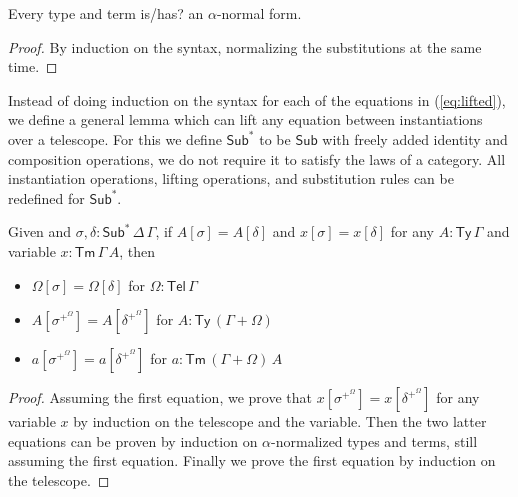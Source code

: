 \documentclass[sigplan,10pt,anonymous,review]{acmart}\settopmatter{printfolios=true,printccs=false,printacmref=false}
\newcommand{\Ty}{\mathsf{Ty}}
\newcommand{\Tm}{\mathsf{Tm}}
\newcommand{\Sub}{\mathsf{Sub}}
\newcommand{\Tel}{\mathsf{Tel}}
\begin{document}
\begin{lemma}
  \label{thm:alpha}
  Every type and term is/has? an $\alpha$-normal form.
\end{lemma}
\begin{proof}
  By induction on the syntax, normalizing the substitutions at the same time.
\end{proof}

Instead of doing induction on the syntax for each of the equations in
(\ref{eq:lifted}), we define a general lemma which can lift any equation between
instantiations over a telescope. For this we define $\Sub^*$ to be $\Sub$ with
freely added identity and composition operations, we do not require it to
satisfy the laws of a category. All instantiation operations, lifting
operations, and substitution rules can be redefined for $\Sub^*$.
\begin{lemma}
  \label{thm:lifting}
  Given and $\sigma, \delta : \Sub^*\,\Delta\,\Gamma$, if $A[\sigma] =
  A[\delta]$ and $x[\sigma] = x[\delta]$ for any $A:\Ty\,\Gamma$ and variable
  $x:\Tm\,\Gamma\,A$, then
  \begin{itemize}
    \item $\Omega[\sigma] = \Omega[\delta]$ for $\Omega:\Tel\,\Gamma$
    \item $A[\sigma^{+^\Omega}] = A[\delta^{+^\Omega}]$ for $A:\Ty\,(\Gamma+\Omega)$
    \item $a[\sigma^{+^\Omega}] = a[\delta^{+^\Omega}]$ for $a:\Tm\,(\Gamma+\Omega)\,A$
  \end{itemize}
\end{lemma}
\begin{proof}
  Assuming the first equation, we prove that $x[\sigma^{+^\Omega}] =
  x[\delta^{+^\Omega}]$ for any variable $x$ by induction on the telescope and
  the variable. Then the two latter equations can be proven by induction on
  $\alpha$-normalized types and terms, still assuming the first equation.
  Finally we prove the first equation by induction on the telescope.
\end{proof}
\end{document}
